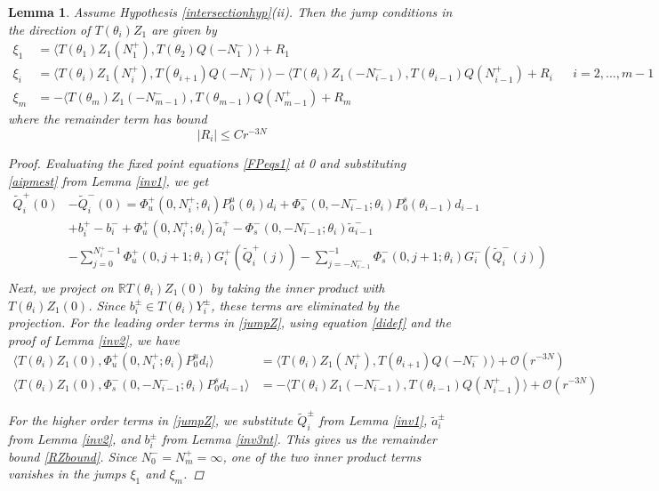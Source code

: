 \documentclass[12pt]{article}
\def\R{{\mathbb R}}
\newtheorem{lemma}{Lemma}
\begin{document}
\begin{lemma}\label{jumpZlemma}
Assume Hypothesis \ref{intersectionhyp}(ii). Then the jump conditions in the direction of $T(\theta_i) Z_1$ are given by
\begin{equation*}
\begin{aligned}
\xi_1 &= \langle T(\theta_1) Z_1(N_1^+), T(\theta_2) Q(-N_1^-) \rangle + R_1  \\
\xi_i &= \langle T(\theta_i) Z_1(N_i^+), T(\theta_{i+1}) Q(-N_i^-) \rangle
- \langle T(\theta_i) Z_1(-N_{i-1}^-), T(\theta_{i-1}) Q(N_{i-1}^+) + R_i &&
i = 2, \dots, m-1 \\
\xi_m &= -\langle T(\theta_m) Z_1(-N_{m-1}^-), T(\theta_{m-1}) Q(N_{m-1}^+) + R_m
\end{aligned}
\end{equation*}
where the remainder term has bound
\begin{equation}\label{RZbound}
|R_i| \leq C r^{-3N}
\end{equation}
\begin{proof}
Evaluating the fixed point equations \eqref{FPeqs1} at 0 and substituting \eqref{aipmest} from Lemma \ref{inv1}, we get
\begin{align*}
\tilde{Q}_i^+(0) &- \tilde{Q}_i^-(0) = \Phi_u^+(0, N_i^+; \theta_i) P_0^u(\theta_i) d_i + \Phi_s^-(0, -N_{i-1}^-; \theta_i) P_0^s(\theta_{i-1}) d_{i-1} \\
&+ b_i^+ - b_i^- 
+ \Phi_u^+(0, N_i^+; \theta_i) \tilde{a}_i^+ - \Phi_s^-(0, -N_{i-1}^-; \theta_i) \tilde{a}_{i-1}^- \\
&- \sum_{j = 0}^{N_i^+-1} \Phi_u^+(0, j+1; \theta_i) G_i^+(\tilde{Q}_i^+(j)) 
- \sum_{j = -N_{i-1}^-}^{-1} \Phi_s^-(0, j+1; \theta_i) G_i^-(\tilde{Q}_i^-(j)) \\
\end{align*}
Next, we project on $\R T(\theta_i) Z_1(0)$ by taking the inner product with $T(\theta_i) Z_1(0)$. Since $b_i^\pm \in T(\theta_i) Y_i^\pm$, these terms are eliminated by the projection. For the leading order terms in \eqref{jumpZ}, using equation \eqref{didef} and the proof of Lemma \ref{inv2}, we have
\begin{align*}
\langle T(\theta_i) Z_1(0), \Phi_u^+(0, N_i^+; \theta_i) P_0^u d_i \rangle
&= \langle T(\theta_i) Z_1(N_i^+), T(\theta_{i+1}) Q(-N_i^-) \rangle + \mathcal{O}(r^{-3N}) \\
\langle T(\theta_i) Z_1(0), \Phi_s^-(0, -N_{i-1}^-; \theta_i) P_0^s d_{i-1} \rangle
&= -\langle T(\theta_i) Z_1(-N_{i-1}^-), T(\theta_{i-1}) Q(N_{i-1}^+) \rangle + \mathcal{O}(r^{-3N})
\end{align*}

For the higher order terms in \eqref{jumpZ}, we substitute $\tilde{Q}_i^\pm$ from Lemma \ref{inv1}, $\tilde{a}_i^\pm$ from Lemma \ref{inv2}, and $b_i^\pm$ from Lemma \ref{inv3nt}. This gives us the remainder bound \eqref{RZbound}. Since $N_0^- = N_m^+ = \infty$, one of the two inner product terms vanishes in the jumps $\xi_1$ and $\xi_m$. 
\end{proof}
\end{lemma}
\end{document}
